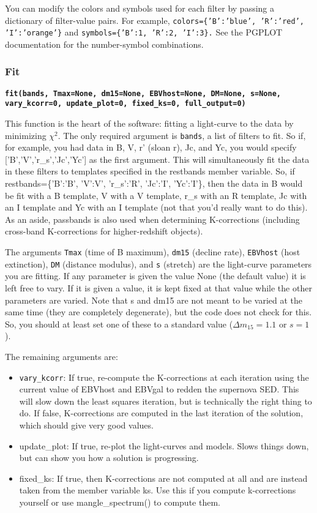 \documentclass[12pt]{article}
\begin{document}
You can modify the colors and symbols used for each filter by passing
a dictionary of filter-value pairs. For example, \texttt{colors=\{'B':'blue',
'R':'red', 'I':'orange'\}} and \texttt{symbols=\{'B':1, 'R':2, 'I':3\}.}
See the PGPLOT documentation for the number-symbol combinations.


\subsubsection{Fit}

\texttt{\textbf{fit(bands, Tmax=None, dm15=None, EBVhost=None, DM=None,
s=None, vary\_kcorr=0, update\_plot=0, fixed\_ks=0, full\_output=0)}}

This function is the heart of the software: fitting a light-curve
to the data by minimizing $\chi^{2}$. The only required argument
is \texttt{bands}, a list of filters to fit. So if, for example, you
had data in B, V, r' (sloan r), Jc, and Yc, you would specify {[}'B','V','r\_s','Jc','Yc']
as the first argument. This will simultaneously fit the data in these
filters to templates specified in the restbands member variable. So,
if restbands=\{'B':'B', 'V':V', 'r\_s':'R', 'Jc':'I', 'Yc':'I'\},
then the data in B would be fit with a B template, V with a V template,
r\_s with an R template, Jc with an I template and Yc with an I template
(not that you'd really want to do this). As an aside, passbands is
also used when determining K-corrections (including cross-band K-corrections
for higher-redshift objects).

The arguments \texttt{Tmax} (time of B maximum), \texttt{dm15} (decline
rate), \texttt{EBVhost} (host extinction), \texttt{DM} (distance modulus),
and \texttt{s} (stretch) are the light-curve parameters you are fitting.
If any parameter is given the value None (the default value) it is
left free to vary. If it is given a value, it is kept fixed at that
value while the other parameters are varied. Note that s and dm15
are not meant to be varied at the same time (they are completely degenerate),
but the code does not check for this. So, you should at least set
one of these to a standard value ($\Delta m_{15}=1.1$ or $s=1$).

The remaining arguments are:

\begin{itemize}
\item $ $\texttt{vary\_kcorr}: If true, re-compute the K-corrections at
each iteration using the current value of EBVhost and EBVgal to redden
the supernova SED. This will slow down the least squares iteration,
but is technically the right thing to do. If false, K-corrections
are computed in the last iteration of the solution, which should give
very good values.
\item update\_plot: If true, re-plot the light-curves and models. Slows
things down, but can show you how a solution is progressing.
\item fixed\_ks: If true, then K-corrections are not computed at all and
are instead taken from the member variable ks. Use this if you compute
k-corrections yourself or use mangle\_spectrum() to compute them.
\end{itemize}
\end{document}
